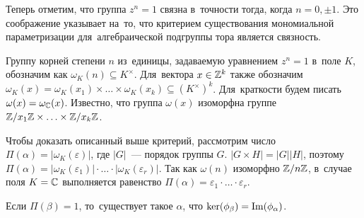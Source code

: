 \documentclass[a4paper,oneside]{article}
\begin{document}
Теперь отметим, что группа $z^n = 1$ связна в~точности тогда, когда $n = 0, \pm 1$.
Это соображение указывает на~то, что критерием существования мономиальной параметризации
для~алгебраической подгруппы тора является связность.

Группу корней степени $n$ из~единицы, задаваемую уравнением $z^n = 1$ в~поле $K$, обозначим как $\omega_K(n) \subseteq K^\times$.
Для~вектора $x \in \mathbb{Z}^k$ также обозначим $\omega_K(x) = \omega_K(x_1) \times \ldots \times \omega_K(x_k) \subseteq (K^\times)^k$.
Для~краткости будем писать $\omega(x) = \omega_{\mathbb{C}}(x)$. Известно, что группа $\omega(x)$ изоморфна
группе $\mathbb{Z} / x_1 \mathbb{Z} \times \ldots \times \mathbb{Z} / x_k \mathbb{Z}$.

Чтобы доказать описанный выше критерий, рассмотрим число $\Pi(\alpha) = |\omega_K(\varepsilon)|$, где $|G|$~— порядок группы $G$.
$|G \times H| = |G| |H|$, поэтому $\Pi(\alpha) = |\omega_K(\varepsilon_1)| \cdot \ldots \cdot |\omega_K(\varepsilon_r)|$.
Так как $\omega(n)$ изоморфно $\mathbb{Z} / n \mathbb{Z}$, в~случае поля $K = \mathbb{C}$ выполняется
равенство $\Pi(\alpha) = \varepsilon_1 \cdot \ldots \cdot \varepsilon_r$.

\begin{lemma}
\label{lemma:exactOutOfPi}
    Если $\Pi(\beta) = 1$, то~существует такое $\alpha$, что $\ker(\phi_\beta) = \mathrm{Im}(\phi_\alpha)$.
\end{lemma}
\end{document}
